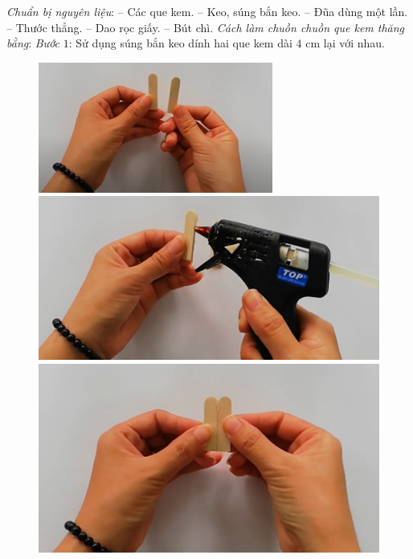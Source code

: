 \begin{multicols}{2}
	\vskip 0.1cm
	\textit{Chuẩn bị nguyên liệu}: 
	\vskip 0.1cm
	-- Các que kem.
	\vskip 0.1cm
	-- Keo, súng bắn keo.
	\vskip 0.1cm
	-- Đũa dùng một lần.
	\vskip 0.1cm
	-- Thước thẳng.
	\vskip 0.1cm
	-- Dao rọc giấy.
	\vskip 0.1cm
	-- Bút chì.
	\vskip 0.1cm
	\textit{Cách làm chuồn chuồn que kem thăng bằng}:
	\vskip 0.1cm
	\textit{Bước} $1$: Sử dụng súng bắn keo dính hai que kem dài $4$ cm lại với nhau.
	\begin{figure}[H]
		\vspace*{-5pt}
		\centering
		\captionsetup{labelformat= empty, justification=centering}
		\includegraphics[width= 1\linewidth]{11}
		\includegraphics[width= 1\linewidth]{12}
		\includegraphics[width= 1\linewidth]{13}

\end{figure}
\end{multicols}
